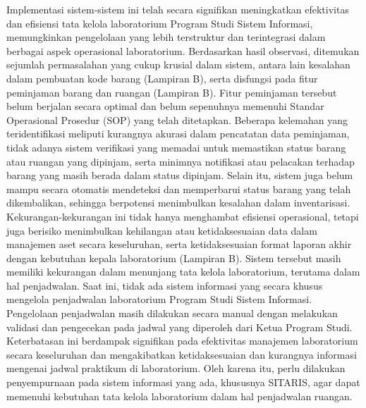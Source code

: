Implementasi sistem-sistem ini telah secara signifikan meningkatkan efektivitas dan efisiensi tata kelola laboratorium Program Studi Sistem Informasi, memungkinkan pengelolaan yang lebih terstruktur dan terintegrasi dalam berbagai aspek operasional laboratorium. Berdasarkan hasil observasi, ditemukan sejumlah permasalahan yang cukup krusial dalam sistem, antara lain kesalahan dalam pembuatan kode barang (Lampiran B), serta disfungsi pada fitur peminjaman barang dan ruangan (Lampiran B). Fitur peminjaman tersebut belum berjalan secara optimal dan belum sepenuhnya memenuhi Standar Operasional Prosedur (SOP) yang telah ditetapkan. Beberapa kelemahan yang teridentifikasi meliputi kurangnya akurasi dalam pencatatan data peminjaman, tidak adanya sistem verifikasi yang memadai untuk memastikan status barang atau ruangan yang dipinjam, serta minimnya notifikasi atau pelacakan terhadap barang yang masih berada dalam status dipinjam. Selain itu, sistem juga belum mampu secara otomatis mendeteksi dan memperbarui status barang yang telah dikembalikan, sehingga berpotensi menimbulkan kesalahan dalam inventarisasi. Kekurangan-kekurangan ini tidak hanya menghambat efisiensi operasional, tetapi juga berisiko menimbulkan kehilangan atau ketidaksesuaian data dalam manajemen aset secara keseluruhan, serta ketidaksesuaian format laporan akhir dengan kebutuhan kepala laboratorium (Lampiran B). Sistem tersebut masih memiliki kekurangan dalam menunjang tata kelola laboratorium, terutama dalam hal penjadwalan. Saat ini, tidak ada sistem informasi yang secara khusus mengelola penjadwalan laboratorium Program Studi Sistem Informasi. Pengelolaan penjadwalan masih dilakukan secara manual dengan melakukan validasi dan pengecekan pada jadwal yang diperoleh dari Ketua Program Studi. Keterbatasan ini berdampak signifikan pada efektivitas manajemen laboratorium secara keseluruhan dan mengakibatkan ketidaksesuaian dan kurangnya informasi mengenai jadwal praktikum di laboratorium. Oleh karena itu, perlu dilakukan penyempurnaan pada sistem informasi yang ada, khususnya SITARIS, agar dapat memenuhi kebutuhan tata kelola laboratorium dalam hal penjadwalan ruangan.

